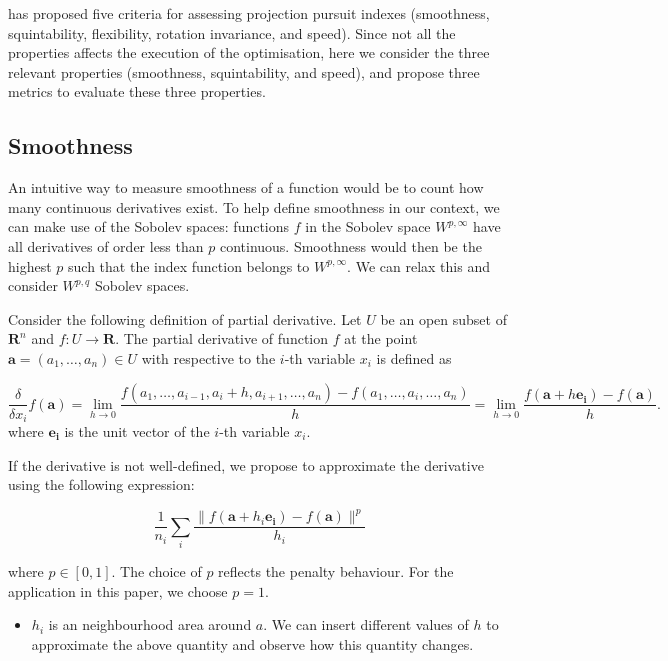 \documentclass[
  number,
  preprint,
  3p]{elsarticle}
\providecommand{\tightlist}{%
  \setlength{\itemsep}{0pt}\setlength{\parskip}{0pt}}\usepackage{longtable,booktabs,array}
\begin{document}
\citet{laa_using_2020} has proposed five criteria for assessing
projection pursuit indexes (smoothness, squintability, flexibility,
rotation invariance, and speed). Since not all the properties affects
the execution of the optimisation, here we consider the three relevant
properties (smoothness, squintability, and speed), and propose three
metrics to evaluate these three properties.

\hypertarget{smoothness}{%
\subsection{Smoothness}\label{smoothness}}

An intuitive way to measure smoothness of a function would be to count
how many continuous derivatives exist. To help define smoothness in our
context, we can make use of the Sobolev spaces: functions \(f\) in the
Sobolev space \(W^{p,\infty}\) have all derivatives of order less than
\(p\) continuous. Smoothness would then be the highest \(p\) such that
the index function belongs to \(W^{p,\infty}\). We can relax this and
consider \(W^{p,q}\) Sobolev spaces.

Consider the following definition of partial derivative. Let \(U\) be an
open subset of \(\mathbf{R}^n\) and \(f: U \rightarrow \mathbf{R}\). The
partial derivative of function \(f\) at the point
\(\mathbf{a} = (a_1, \ldots, a_n) \in U\) with respective to the
\(i\)-th variable \(x_i\) is defined as

\[
\frac{\delta}{\delta x_i} f(\mathbf{a}) =  \lim_{h \rightarrow 0} \frac{f(a_1, \ldots, a_{i-1}, a_i +h, a_{i+1}, \ldots, a_n) - f(a_1 , \ldots, a_i, \ldots, a_n)}{h} = \lim_{h\rightarrow 0} \frac{f(\mathbf{a} + h\mathbf{e_i}) - f(\mathbf{a})}{h}.
\] where \(\mathbf{e_i}\) is the unit vector of the \(i\)-th variable
\(x_i\).

If the derivative is not well-defined, we propose to approximate the
derivative using the following expression:

\[\frac{1}{n_i}\sum_{i} \frac{\|f(\mathbf{a} + h_i\mathbf{e_i}) - f(\mathbf{a})\|^p}{h_i}\]

where \(p \in [0,1]\). The choice of \(p\) reflects the penalty
behaviour. For the application in this paper, we choose \(p = 1\).

\begin{itemize}
\tightlist
\item
  \(h_i\) is an neighbourhood area around \(a\). We can insert different
  values of \(h\) to approximate the above quantity and observe how this
  quantity changes.
\end{itemize}
\end{document}
